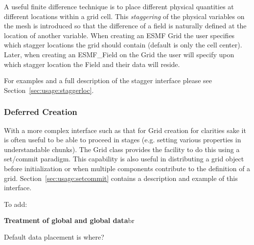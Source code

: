  A useful finite difference technique is to place different physical quantities at different locations within a grid cell. This {\em {staggering}} of the physical variables on the mesh is introduced so that the difference of a field is naturally defined at the location of another variable. When creating an 
ESMF Grid the user specifies which stagger locations the grid should 
contain (default is only the cell center). Later, when creating an  ESMF\_Field
on the Grid the user will specify upon which stagger location the Field
and their data will reside.
 
For examples and a full description of the stagger interface 
please see Section~\ref{sec:usage:staggerloc}. 

\subsubsection{Deferred Creation}

 With a more complex interface such as that for Grid creation
for clarities sake it is often useful to be able to proceed in stages
(e.g. setting various properties in understandable chunks). The 
Grid class provides the facility to do this using a set/commit paradigm.
This capability is also useful in distributing a grid object before
initialization or when multiple components contribute to the 
definition of a grid. Section~\ref{sec:usage:setcommit}
contains a description and example of this interface. 


To add:

{\bf Treatment of global and global data}{br}
 
Default data placement is where?


